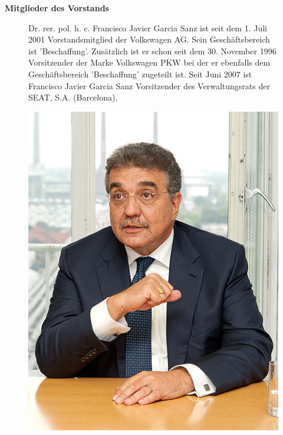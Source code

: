 \documentclass[12pt]{article}
\begin{document}
\textbf{Mitglieder des Vorstands}
\begin{figure}[here!]
	\centering
	\begin{minipage}[h]{0.65\textwidth}
		Dr. rer. pol. h. c. Francisco Javier Garcia Sanz ist seit dem 1. Juli 2001 Vorstandsmitglied der Volkswagen AG. Sein Geschäftsbereich ist 'Beschaffung'. Zusätzlich ist er schon seit dem 30. November 1996 Vorsitzender der Marke Volkswagen PKW bei der er ebenfalls dem Geschäftsbereich 'Beschaffung' zugeteilt ist. Seit Juni 2007 ist Francisco Javier Garcia Sanz Vorsitzender des Verwaltungsrats der SEAT, S.A. (Barcelona).
	\end{minipage}
		\begin{minipage}[h]{0.10\textwidth}
		\hspace{1cm}
		\cite{fspic}
	\end{minipage}
	\begin{minipage}[h]{0.20\textwidth}
		\centering
		\includegraphics[width=1.0\textwidth]{images/FranciscoSanz.jpg}
		\label{fig:vorstandvw1}
	\end{minipage}
\end{figure}
\end{document}
